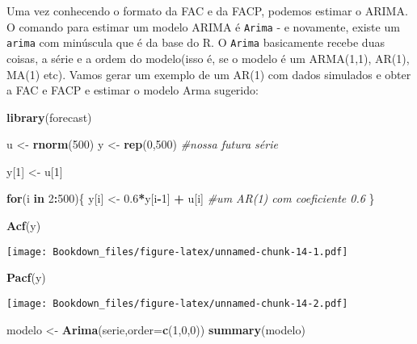 \documentclass[]{book}
\newenvironment{Shaded}{\begin{snugshade}}{\end{snugshade}}
\newcommand{\KeywordTok}[1]{\textcolor[rgb]{0.13,0.29,0.53}{\textbf{#1}}}
\newcommand{\DataTypeTok}[1]{\textcolor[rgb]{0.13,0.29,0.53}{#1}}
\newcommand{\DecValTok}[1]{\textcolor[rgb]{0.00,0.00,0.81}{#1}}
\newcommand{\FloatTok}[1]{\textcolor[rgb]{0.00,0.00,0.81}{#1}}
\newcommand{\StringTok}[1]{\textcolor[rgb]{0.31,0.60,0.02}{#1}}
\newcommand{\CommentTok}[1]{\textcolor[rgb]{0.56,0.35,0.01}{\textit{#1}}}
\newcommand{\ControlFlowTok}[1]{\textcolor[rgb]{0.13,0.29,0.53}{\textbf{#1}}}
\newcommand{\OperatorTok}[1]{\textcolor[rgb]{0.81,0.36,0.00}{\textbf{#1}}}
\newcommand{\NormalTok}[1]{#1}
\begin{document}
Uma vez conhecendo o formato da FAC e da FACP, podemos estimar o ARIMA.
O comando para estimar um modelo ARIMA é \texttt{Arima} - e novamente,
existe um \texttt{arima} com minúscula que é da base do R. O
\texttt{Arima} basicamente recebe duas coisas, a série e a ordem do
modelo(isso é, se o modelo é um ARMA(1,1), AR(1), MA(1) etc). Vamos
gerar um exemplo de um AR(1) com dados simulados e obter a FAC e FACP e
estimar o modelo Arma sugerido:

\begin{Shaded}
\begin{Highlighting}[]
\KeywordTok{library}\NormalTok{(forecast)}

\NormalTok{u <-}\StringTok{ }\KeywordTok{rnorm}\NormalTok{(}\DecValTok{500}\NormalTok{)}
\NormalTok{y <-}\StringTok{ }\KeywordTok{rep}\NormalTok{(}\DecValTok{0}\NormalTok{,}\DecValTok{500}\NormalTok{) }\CommentTok{#nossa futura série}

\NormalTok{y[}\DecValTok{1}\NormalTok{] <-}\StringTok{ }\NormalTok{u[}\DecValTok{1}\NormalTok{]}

\ControlFlowTok{for}\NormalTok{(i }\ControlFlowTok{in} \DecValTok{2}\OperatorTok{:}\DecValTok{500}\NormalTok{)\{}
\NormalTok{  y[i] <-}\StringTok{ }\FloatTok{0.6}\OperatorTok{*}\NormalTok{y[i}\OperatorTok{-}\DecValTok{1}\NormalTok{] }\OperatorTok{+}\StringTok{ }\NormalTok{u[i] }\CommentTok{#um AR(1) com coeficiente 0.6}
\NormalTok{\}}

\KeywordTok{Acf}\NormalTok{(y)}
\end{Highlighting}
\end{Shaded}

\texttt{[image: Bookdown\_files/figure-latex/unnamed-chunk-14-1.pdf]}

\begin{Shaded}
\begin{Highlighting}[]
\KeywordTok{Pacf}\NormalTok{(y)}
\end{Highlighting}
\end{Shaded}

\texttt{[image: Bookdown\_files/figure-latex/unnamed-chunk-14-2.pdf]}

\begin{Shaded}
\begin{Highlighting}[]
\NormalTok{modelo <-}\StringTok{ }\KeywordTok{Arima}\NormalTok{(serie,}\DataTypeTok{order=}\KeywordTok{c}\NormalTok{(}\DecValTok{1}\NormalTok{,}\DecValTok{0}\NormalTok{,}\DecValTok{0}\NormalTok{))}
\KeywordTok{summary}\NormalTok{(modelo)}
\end{Highlighting}
\end{Shaded}
\end{document}
